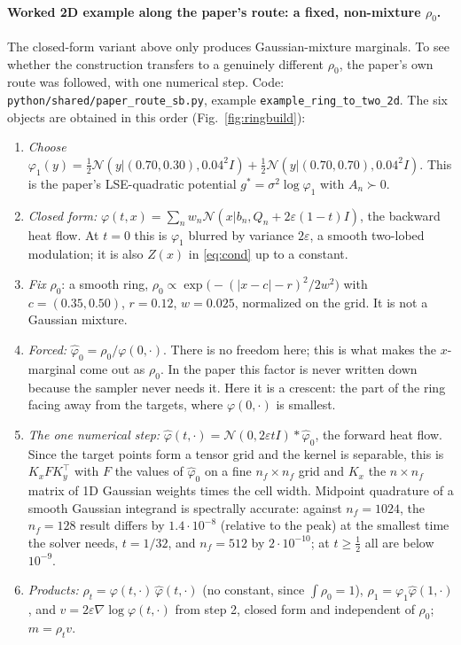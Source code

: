 \documentclass[11pt]{article}
\newcommand{\eps}{\varepsilon}
\newcommand{\code}[1]{\texttt{#1}}
\begin{document}
\paragraph{Worked 2D example along the paper's route: a fixed, non-mixture $\rho_0$.}
The closed-form variant above only produces Gaussian-mixture marginals. To see
whether the construction transfers to a genuinely different $\rho_0$, the paper's
own route was followed, with one numerical step. Code:
\code{python/shared/paper\_route\_sb.py}, example \code{example\_ring\_to\_two\_2d}.
The six objects are obtained in this order (Fig.~\ref{fig:ringbuild}):
\begin{enumerate}[leftmargin=1.6em, itemsep=1pt]
  \item \emph{Choose} $\varphi_1(y)=\tfrac12\mathcal N(y|(0.70,0.30),0.04^2I)+\tfrac12\mathcal N(y|(0.70,0.70),0.04^2I)$. This is the paper's LSE-quadratic potential $g^\ast=\sigma^2\log\varphi_1$ with $A_n\succ0$.
  \item \emph{Closed form:} $\varphi(t,x)=\sum_n w_n\mathcal N(x|b_n,Q_n+2\eps(1-t)I)$, the backward heat flow. At $t=0$ this is $\varphi_1$ blurred by variance $2\eps$, a smooth two-lobed modulation; it is also $Z(x)$ in \eqref{eq:cond} up to a constant.
  \item \emph{Fix} $\rho_0$: a smooth ring, $\rho_0\propto\exp\bigl(-(|x-c|-r)^2/2w^2\bigr)$ with $c=(0.35,0.50)$, $r=0.12$, $w=0.025$, normalized on the grid. It is not a Gaussian mixture.
  \item \emph{Forced:} $\hat\varphi_0=\rho_0/\varphi(0,\cdot)$. There is no freedom here; this is what makes the $x$-marginal come out as $\rho_0$. In the paper this factor is never written down because the sampler never needs it. Here it is a crescent: the part of the ring facing away from the targets, where $\varphi(0,\cdot)$ is smallest.
  \item \emph{The one numerical step:} $\hat\varphi(t,\cdot)=\mathcal N(0,2\eps tI)\ast\hat\varphi_0$, the forward heat flow. Since the target points form a tensor grid and the kernel is separable, this is $K_x F K_y^{\top}$ with $F$ the values of $\hat\varphi_0$ on a fine $n_f\times n_f$ grid and $K_x$ the $n\times n_f$ matrix of 1D Gaussian weights times the cell width. Midpoint quadrature of a smooth Gaussian integrand is spectrally accurate: against $n_f=1024$, the $n_f=128$ result differs by $1.4\cdot10^{-8}$ (relative to the peak) at the smallest time the solver needs, $t=1/32$, and $n_f=512$ by $2\cdot10^{-10}$; at $t\ge\tfrac12$ all are below $10^{-9}$.
  \item \emph{Products:} $\rho_t=\varphi(t,\cdot)\,\hat\varphi(t,\cdot)$ (no constant, since $\int\rho_0=1$), $\rho_1=\varphi_1\hat\varphi(1,\cdot)$, and $v=2\eps\nabla\log\varphi(t,\cdot)$ from step 2, closed form and independent of $\rho_0$; $m=\rho_tv$.
\end{enumerate}
\end{document}
